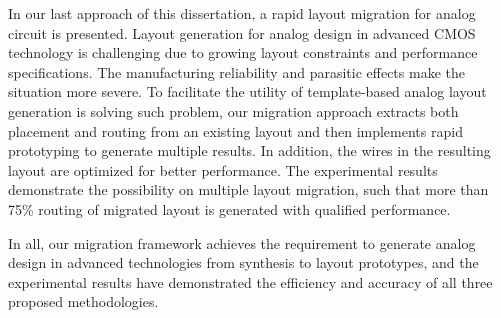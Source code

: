 In our last approach of this dissertation, a rapid layout migration for analog circuit is presented. Layout generation for analog design in advanced CMOS technology is challenging due to growing layout constraints and performance specifications. The manufacturing reliability and parasitic effects make the situation more severe. To facilitate the utility of template-based analog layout generation is solving such problem, our migration approach extracts both placement and routing from an existing layout and then implements rapid prototyping to generate multiple results. In addition, the wires in the resulting layout are optimized for better performance. The experimental results demonstrate the possibility on multiple layout migration, such that more than 75\% routing of migrated layout is generated with qualified performance. 

In all, our migration framework achieves the requirement to generate analog design in advanced technologies from synthesis to layout prototypes, and the experimental results have demonstrated the efficiency and accuracy of all three proposed methodologies. 


